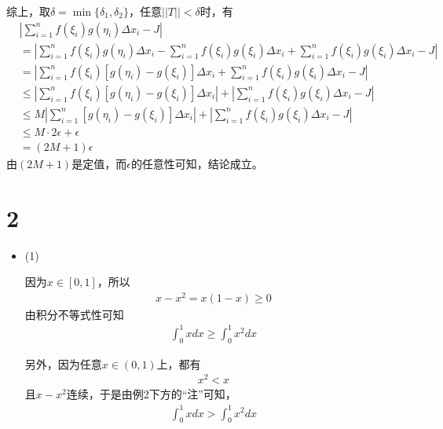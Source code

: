 \documentclass{article}
\begin{document}
综上，取$\delta = \min\{\delta_1, \delta_2\}$，任意$||T|| < \delta$时，有
\begin{align*}
   & |\sum\limits_{i=1}^n f(\xi_i) g(\eta_i) \Delta x_i - J|                                                                                                          \\
   & = |\sum\limits_{i=1}^n f(\xi_i) g(\eta_i) \Delta x_i - \sum\limits_{i=1}^n f(\xi_i) g(\xi_i) \Delta x_i + \sum\limits_{i=1}^n f(\xi_i) g(\xi_i) \Delta x_i  - J| \\
   & = |\sum\limits_{i=1}^n f(\xi_i) [g(\eta_i) - g(\xi_i)] \Delta x_i + \sum\limits_{i=1}^n f(\xi_i) g(\xi_i) \Delta x_i  - J|                                       \\
   & \leq |\sum\limits_{i=1}^n f(\xi_i) [g(\eta_i) - g(\xi_i)] \Delta x_i| + |\sum\limits_{i=1}^n f(\xi_i) g(\xi_i) \Delta x_i  - J|                                  \\
   & \leq M|\sum\limits_{i=1}^n [g(\eta_i) - g(\xi_i)] \Delta x_i| + |\sum\limits_{i=1}^n f(\xi_i) g(\xi_i) \Delta x_i  - J|                                          \\
   & \leq M \cdot 2\epsilon + \epsilon                                                                                                                                \\
   & = (2 M + 1) \epsilon
\end{align*}
由$(2M + 1)$是定值，而$\epsilon$的任意性可知，结论成立。

\section*{2}

\begin{itemize}
  \item (1)

        因为$x \in [0, 1]$，所以
        \begin{align*}
          x - x^2 = x(1 - x) \geq 0
        \end{align*}
        由积分不等式性可知
        \begin{align*}
          \int_{0}^{1} x dx \geq \int_{0}^{1} x^2 dx
        \end{align*}

        另外，因为任意$x \in (0, 1)$上，都有
        \begin{align*}
          x^2 < x
        \end{align*}
        且$x - x^2$连续，于是由例2下方的“注”可知，
        \begin{align*}
          \int_{0}^{1} x dx > \int_{0}^{1} x^2 dx
        \end{align*}
\end{itemize}
\end{document}
